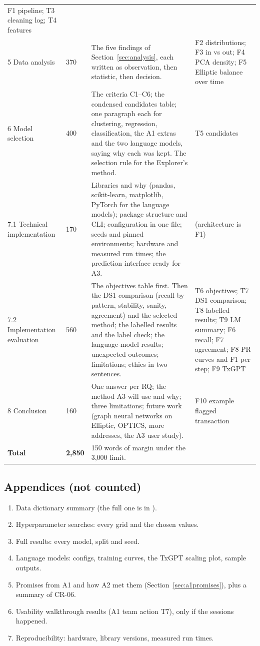 \begin{longtable}{@{}L{2.6cm}C{1.25cm}L{7.15cm}L{3.2cm}@{}}
F1 pipeline; T3 cleaning log; T4 features \\
5 Data analysis & 370 &
The five findings of Section~\ref{sec:analysis}, each written as observation, then statistic,
then decision. &
F2 distributions; F3 in vs out; F4 PCA density; F5 Elliptic balance over time \\
6 Model selection & 400 &
The criteria C1--C6; the condensed candidates table; one paragraph each for clustering,
regression, classification, the A1 extras and the two language models, saying why each was
kept. The selection rule for the Explorer's method. &
T5 candidates \\
7.1 Technical implementation & 170 &
Libraries and why (pandas, scikit-learn, matplotlib, PyTorch for the language models); package
structure and CLI; configuration in one file; seeds and pinned environments; hardware and
measured run times; the prediction interface ready for A3. &
(architecture is F1) \\
7.2 Implementation evaluation & 560 &
The objectives table first. Then the DS1 comparison (recall by pattern, stability, sanity,
agreement) and the selected method; the labelled results and the label check; the language-model
results; unexpected outcomes; limitations; ethics in two sentences. &
T6 objectives; T7 DS1 comparison; T8 labelled results; T9 LM summary; F6 recall; F7 agreement; F8 PR curves and F1 per step; F9 TxGPT \\
8 Conclusion & 160 &
One answer per RQ; the method A3 will use and why; three limitations; future work (graph neural
networks on Elliptic, OPTICS, more addresses, the A3 user study). &
F10 example flagged transaction \\
\midrule
\textbf{Total} & \textbf{2,850} & 150 words of margin under the 3,000 limit. & \\
\bottomrule
\end{longtable}

\subsection{Appendices (not counted)}

\begin{enumerate}[label=\Alph*.]
  \item Data dictionary summary (the full one is in ).
  \item Hyperparameter searches: every grid and the chosen values.
  \item Full results: every model, split and seed.
  \item Language models: configs, training curves, the TxGPT scaling plot, sample outputs.
  \item Promises from A1 and how A2 met them (Section~\ref{sec:a1promises}), plus a summary of
    CR-06.
  \item Usability walkthrough results (A1 team action T7), only if the sessions happened.
  \item Reproducibility: hardware, library versions, measured run times.
\end{enumerate}

